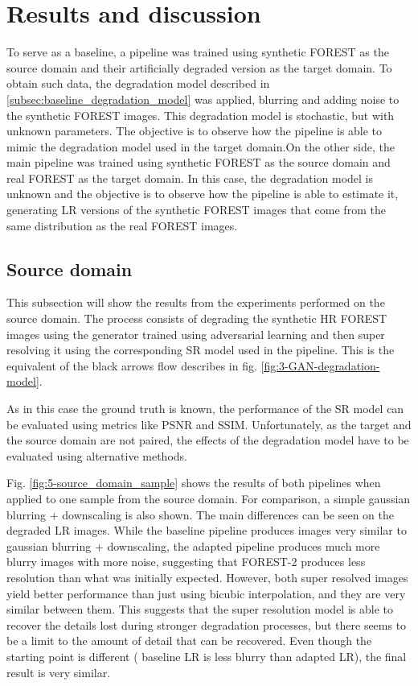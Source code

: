 \section{Results and discussion}\label{sec:results}

To serve as a baseline, a pipeline was trained using synthetic FOREST as the source domain and their artificially degraded version as the target domain. 
To obtain such data, the degradation model described in \ref{subsec:baseline_degradation_model} was applied, blurring and adding noise to the synthetic FOREST images.
This degradation model is stochastic, but with unknown parameters. The objective is to observe how the pipeline is able to mimic the degradation model used in the target domain.On the other side, the main pipeline was trained using synthetic FOREST as the source domain and real FOREST as the target domain. 
In this case, the degradation model is unknown and the objective is to observe how the pipeline is able to estimate it, generating LR versions of the synthetic FOREST images that come from the same distribution as the real FOREST images.

    \subsection{Source domain}

        This subsection will show the results from the experiments performed on the source domain.
        The process consists of degrading the synthetic HR FOREST images using the generator trained using adversarial learning and then super resolving it using the corresponding SR model used in the pipeline.
        This is the equivalent of the black arrows flow describes in fig. \ref{fig:3-GAN-degradation-model}. 

        As in this case the ground truth is known, the performance of the SR model can be evaluated using metrics like PSNR and SSIM. 
        Unfortunately, as the target and the source domain are not paired, the effects of the degradation model have to be evaluated using alternative methods.

        Fig. \ref{fig:5-source_domain_sample} shows the results of both pipelines when applied to one sample from the source domain. 
        For comparison, a simple gaussian blurring + downscaling is also shown. 
        The main differences can be seen on the degraded LR images. While the baseline pipeline produces images very similar to gaussian blurring + downscaling, 
        the adapted pipeline produces much more blurry images with more noise, suggesting that FOREST-2 produces less resolution than what was initially expected. 
        However, both super resolved images yield better performance than just using bicubic interpolation, and they are very similar between them.
        This suggests that the super resolution model is able to recover the details lost during stronger degradation processes, but there seems to be a limit to the amount of detail that can be recovered. 
        Even though the starting point is different ( baseline LR is less blurry than adapted LR), the final result is very similar.

